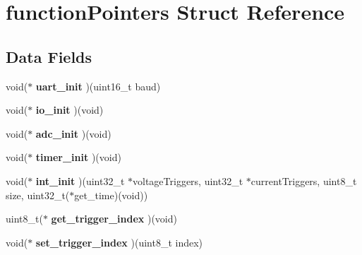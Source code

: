 \hypertarget{structfunctionPointers}{}\section{function\+Pointers Struct Reference}
\label{structfunctionPointers}
\subsection*{Data Fields}
\begin{DoxyCompactItemize}
\item 
\mbox{\label{structfunctionPointers_af94f83bd94afe19a00641e7e40425c08}} 
void($\ast$ {\bfseries uart\+\_\+init} )(uint16\+\_\+t baud)
\item 
\mbox{\label{structfunctionPointers_af23d29fb2811373a53019398100d62f9}} 
void($\ast$ {\bfseries io\+\_\+init} )(void)
\item 
\mbox{\label{structfunctionPointers_a224da1e6a93bc8f636e104bf6b4d7b71}} 
void($\ast$ {\bfseries adc\+\_\+init} )(void)
\item 
\mbox{\label{structfunctionPointers_a96464cb44e73378c3744714386aca246}} 
void($\ast$ {\bfseries timer\+\_\+init} )(void)
\item 
\mbox{\label{structfunctionPointers_a70c8720f486d4d6354e5c3ac3997563d}} 
void($\ast$ {\bfseries int\+\_\+init} )(uint32\+\_\+t $\ast$voltage\+Triggers, uint32\+\_\+t $\ast$current\+Triggers, uint8\+\_\+t size, uint32\+\_\+t($\ast$get\+\_\+time)(void))
\item 
\mbox{\label{structfunctionPointers_a5bc585ab55ed0ff005a7b02edcbec917}} 
uint8\+\_\+t($\ast$ {\bfseries get\+\_\+trigger\+\_\+index} )(void)
\item 
\mbox{\label{structfunctionPointers_a9571591238bfe8a78e8d2deaf29b5ef0}} 
void($\ast$ {\bfseries set\+\_\+trigger\+\_\+index} )(uint8\+\_\+t index)
\item 
\mbox{\label{structfunctionPointers_a7180e2a13ae69995cb51a96a6f499caa}} 

\end{DoxyCompactItemize}
